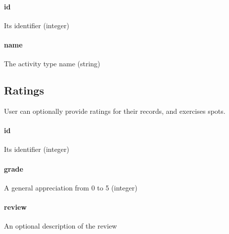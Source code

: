 \documentclass[a4paper]{article}
\begin{document}
\paragraph{id} Its identifier (integer)
\paragraph{name} The activity type name (string)


\subsection{Ratings}
User can optionally provide ratings for their records, and exercises spots.

\paragraph{id} Its identifier (integer)
\paragraph{grade} A general appreciation from 0 to 5 (integer)
\paragraph{review} An optional description of the review
\end{document}
